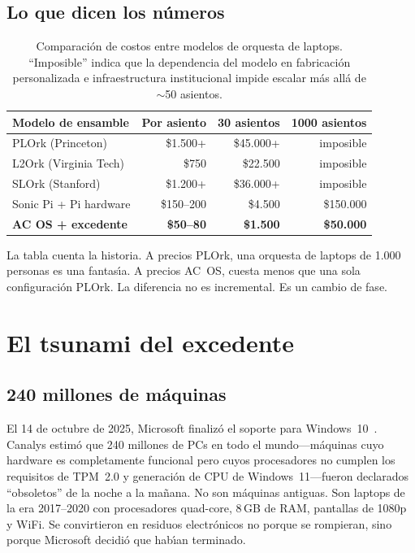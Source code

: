 \documentclass[10pt,letterpaper,twocolumn]{article}
\begin{document}
\subsection{Lo que dicen los n\'{u}meros}

\begin{table}[h]
\small
\centering
\begin{tabular}{lrrr}
\toprule
\textbf{Modelo de ensamble} & \textbf{Por asiento} & \textbf{30 asientos} & \textbf{1000 asientos} \\
\midrule
PLOrk (Princeton)       & \$1.500+ & \$45.000+ & imposible \\
L2Ork (Virginia Tech)   & \$750      & \$22.500  & imposible \\
SLOrk (Stanford)        & \$1.200+ & \$36.000+ & imposible \\
Sonic Pi + Pi hardware   & \$150--200 & \$4.500   & \$150.000 \\
\textbf{AC OS + excedente} & \textbf{\$50--80} & \textbf{\$1.500} & \textbf{\$50.000} \\
\bottomrule
\end{tabular}
\caption{Comparaci\'{o}n de costos entre modelos de orquesta de laptops. ``Imposible'' indica que la dependencia del modelo en fabricaci\'{o}n personalizada e infraestructura institucional impide escalar m\'{a}s all\'{a} de $\sim$50 asientos.}
\label{tab:cost}
\end{table}

La tabla cuenta la historia. A precios PLOrk, una orquesta de laptops de 1.000 personas es una fantas\'{\i}a. A precios AC~OS, cuesta menos que una sola configuraci\'{o}n PLOrk. La diferencia no es incremental. Es un cambio de fase.


\section{El tsunami del excedente}
\label{sec:surplus}

\subsection{240 millones de m\'{a}quinas}

El 14 de octubre de 2025, Microsoft finaliz\'{o} el soporte para Windows~10~\citep{canalys2024windows}. Canalys estim\'{o} que 240 millones de PCs en todo el mundo---m\'{a}quinas cuyo hardware es completamente funcional pero cuyos procesadores no cumplen los requisitos de TPM~2.0 y generaci\'{o}n de CPU de Windows~11---fueron declarados ``obsoletos'' de la noche a la ma\~{n}ana. No son m\'{a}quinas antiguas. Son laptops de la era 2017--2020 con procesadores quad-core, 8\,GB de RAM, pantallas de 1080p y WiFi. Se convirtieron en residuos electr\'{o}nicos no porque se rompieran, sino porque Microsoft decidi\'{o} que hab\'{\i}an terminado.
\end{document}
